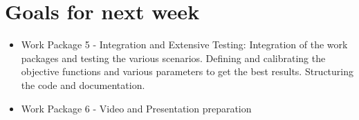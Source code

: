 \documentclass[12pt,pdftex,a4paper]{article}
\begin{document}
\section*{Goals for next week}
\begin{itemize}
\item
Work Package 5 - Integration and Extensive Testing:
Integration of the work packages and testing the various scenarios. Defining and calibrating the objective functions and various parameters to get the best results. Structuring the code and documentation. 
\item
Work Package 6 - Video and Presentation preparation\end{itemize}

\end{document}
